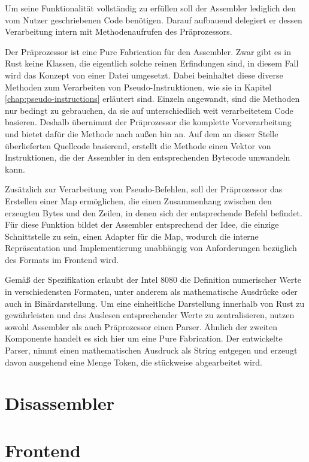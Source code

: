 Um seine Funktionalität vollständig zu erfüllen soll der Assembler lediglich den vom Nutzer geschriebenen Code benötigen. Darauf aufbauend delegiert er dessen Verarbeitung intern mit Methodenaufrufen des Präprozessors.

Der Präprozessor ist eine \glqq Pure Fabrication\grqq{} für den Assembler. Zwar gibt es in Rust keine Klassen, die eigentlich solche reinen Erfindungen sind, in diesem Fall wird das Konzept von einer Datei umgesetzt. Dabei beinhaltet diese diverse Methoden zum Verarbeiten von Pseudo-Instruktionen, wie sie in Kapitel \ref{chap:pseudo-instructions} erläutert sind. Einzeln angewandt, sind die Methoden nur bedingt zu gebrauchen, da sie auf unterschiedlich weit verarbeitetem Code basieren. Deshalb übernimmt der Präprozessor die komplette Vorverarbeitung und bietet dafür die Methode  nach außen hin an. Auf dem an dieser Stelle überlieferten Quellcode basierend, erstellt die Methode einen Vektor von Instruktionen, die der Assembler in den entsprechenden Bytecode umwandeln kann.

Zusätzlich zur Verarbeitung von Pseudo-Befehlen, soll der Präprozessor das Erstellen einer Map ermöglichen, die einen Zusammenhang zwischen den erzeugten Bytes und den Zeilen, in denen sich der entsprechende Befehl befindet. Für diese Funktion bildet der Assembler entsprechend der Idee, die einzige Schnittstelle zu sein, einen Adapter für die Map, wodurch die interne Repräsentation und Implementierung unabhängig von Anforderungen bezüglich des Formats im Frontend wird.

Gemäß der Spezifikation erlaubt der Intel 8080 die Definition numerischer Werte in verschiedensten Formaten, unter anderem als mathematische Ausdrücke oder auch in Binärdarstellung. Um eine einheitliche Darstellung innerhalb von Rust zu gewährleisten und das Auslesen entsprechender Werte zu zentralisieren, nutzen sowohl Assembler als auch Präprozessor einen Parser. Ähnlich der zweiten Komponente handelt es sich hier um eine Pure Fabrication. Der entwickelte Parser, nimmt einen mathematischen Ausdruck als String entgegen und erzeugt davon ausgehend eine Menge Token, die stückweise abgearbeitet wird.

\section{Disassembler}

\section{Frontend}

